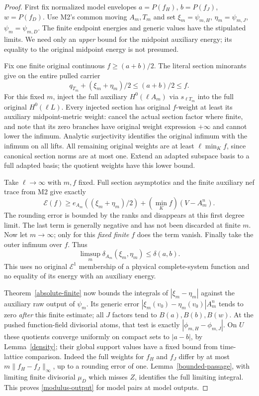 \documentclass[10pt]{article}
\newcommand{\E}{\mathcal E}
\begin{document}
\begin{proof}
First fix normalized model envelopes $a=P(f_H)$, $b=P(f_J)$,
$w=P(f_D)$. Use M2's common moving $A_m,T_m$ and set
$\xi_m=\psi_{m,H}$, $\eta_m=\psi_{m,J}$, $\psi_m=\psi_{m,D}$.
The finite endpoint energies and generic values have the stipulated
limits. We need only an \emph{upper} bound for the midpoint auxiliary
energy; its equality to the original midpoint energy is not presumed.

Fix one finite original continuous $f\geq(a+b)/2$. The literal section
minorants give on the entire pulled carrier
\[
 q_{T_m}+(\xi_m+\eta_m)/2\leq(a+b)/2\leq f.
\]
For this fixed $m$, inject the full auxiliary $H^0(\ell A_m)$ via
$s_{\ell T_m}$ into the full original $H^0(\ell L)$.
Every injected section has original $f$-weight at least its auxiliary
midpoint-metric weight: cancel the actual section factor where finite,
and note that its zero branches have original weight expression
$+\infty$ and cannot lower the infimum. Analytic surjectivity identifies
the original infimum with the infimum on all lifts. All remaining
original weights are at least $\ell\min_Kf$, since canonical section
norms are at most one. Extend an adapted subspace basis to a full
adapted basis; the quotient weights have this lower bound.

Take $\ell\to\infty$ with $m,f$ fixed. Full section asymptotics and the
finite auxiliary nef trace from M2 give exactly
\begin{equation}\label{trace-error}
 \mathscr E(f)\geq
 e_{A_m}((\xi_m+\eta_m)/2)+(\min_Kf)(V-A_m^n).
\end{equation}
The rounding error is bounded by the ranks and disappears at this
first degree limit. The last term is generally negative and has not
been discarded at finite $m$. Now let $m\to\infty$; only for this
\emph{fixed finite} $f$ does the term vanish. Finally take the outer
infimum over $f$. Thus
\[
 \limsup_m\delta_{A_m}(\xi_m,\eta_m)\leq\delta(a,b).
\]
This uses no original $\E^1$ membership of a physical complete-system
function and no equality of its energy with an auxiliary energy.

Theorem~\ref{absolute-finite} now bounds the integrals of
$|\xi_m-\eta_m|$ against the auxiliary raw output of $\psi_m$.
Its generic error $|\xi_m(v_0)-\eta_m(v_0)|A_m^n$ tends to zero
\emph{after} this finite estimate; all $J$ factors tend to $B(a),B(b),B(w)$.
At the pushed function-field divisorial atoms, that test is exactly
$|\phi_{m,H}-\phi_{m,J}|$. On $U$ these quotients converge uniformly
on compact sets to $|a-b|$, by Lemma~\ref{density}; their global
support values have a fixed bound from time-lattice comparison.
Indeed the full weights for $f_H$ and $f_J$ differ by at most
$m\|f_H-f_J\|_\infty$, up to a rounding error of one.
Lemma~\ref{bounded-passage}, with limiting finite divisorial $\mu_D$
which misses $Z$, identifies the full limiting integral. This proves
\eqref{modulus-output} for model pairs at model outputs.


\end{proof}
\end{document}
